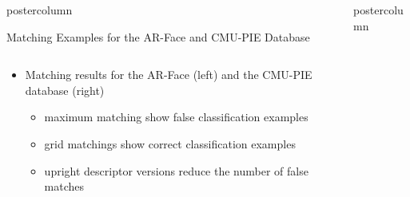 \documentclass[final,hyperref={pdfpagelabels=false}]{beamer}
\newlength{\columnheight}
\begin{document}
\begin{frame}
\begin{columns}
\begin{column}{.49\textwidth}
\begin{beamercolorbox}[center,wd=\textwidth]{postercolumn}
\begin{minipage}[T]{.95\textwidth}
{\begin{block}{Matching Examples for the AR-Face and CMU-PIE Database}
\begin{figure}
\begin{tabular}{p{.09\linewidth} | p{.12\linewidth} | p{.12\linewidth} | p{.12\linewidth} || p{.12\linewidth} | p{.12\linewidth} | p{.12\linewidth} | p{.09\linewidth} }
                \end{tabular}
              \end{figure}
              \begin{itemize}
              \item Matching results for the AR-Face (left) and the CMU-PIE database (right)
                \begin{itemize}
                \item maximum matching show false classification examples
                \item grid matchings show correct classification examples
                \item upright descriptor versions reduce the number of false matches
                \end{itemize}
              \end{itemize}
            \end{block}
          }
        \end{minipage}
      \end{beamercolorbox}
    \end{column}

    \begin{column}{.49\textwidth}
      \begin{beamercolorbox}[center,wd=\textwidth]{postercolumn}
        \begin{minipage}[T]{.95\textwidth} %
          \parbox[t][\columnheight]{\textwidth}{ %

}
\end{minipage}
\end{beamercolorbox}
\end{column}
\end{columns}
\end{frame}
\end{document}
